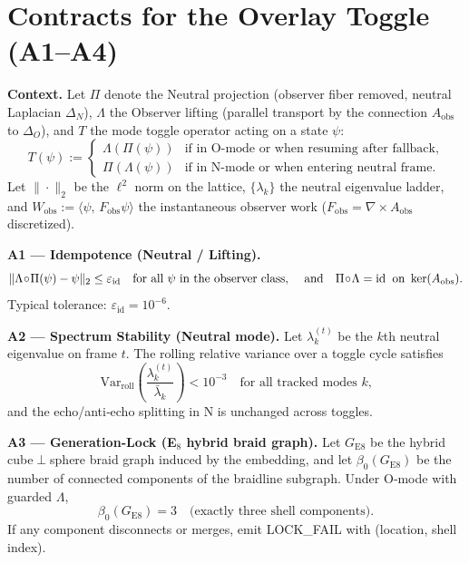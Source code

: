 \section*{Contracts for the Overlay Toggle (A1–A4)}

\noindent\textbf{Context.}
Let $\Pi$ denote the Neutral projection (observer fiber removed, neutral Laplacian $\Delta_N$),
$\Lambda$ the Observer lifting (parallel transport by the connection $A_{\mathrm{obs}}$ to $\Delta_O$),
and $T$ the mode toggle operator acting on a state $\psi$:
\[
T(\psi) :=
\begin{cases}
\Lambda(\Pi(\psi)) & \text{if in O-mode or when resuming after fallback},\\
\Pi(\Lambda(\psi)) & \text{if in N-mode or when entering neutral frame}.
\end{cases}
\]
Let $\|\cdot\|_2$ be the $\ell^2$ norm on the lattice, $\{\lambda_k\}$ the neutral eigenvalue ladder, and
$W_{\mathrm{obs}} := \langle \psi,\, F_{\mathrm{obs}} \psi\rangle$ the instantaneous observer work
($F_{\mathrm{obs}} = \nabla\times A_{\mathrm{obs}}$ discretized).

\vspace{0.75em}
\noindent\textbf{A1 — Idempotence (Neutral / Lifting).}
\[
\|\Lambda\!\circ\!\Pi(\psi) - \psi\|_2 \le \varepsilon_{\mathrm{id}} \quad
\text{for all $\psi$ in the observer class, \quad and}\quad
\Pi\!\circ\!\Lambda = \mathrm{id}\;\; \text{on } \ker(A_{\mathrm{obs}}).
\]
Typical tolerance: $\varepsilon_{\mathrm{id}} = 10^{-6}$.

\vspace{0.5em}
\noindent\textbf{A2 — Spectrum Stability (Neutral mode).}
Let $\lambda_k^{(t)}$ be the $k$th neutral eigenvalue on frame $t$.
The rolling relative variance over a toggle cycle satisfies
\[
\mathrm{Var}_\mathrm{roll}\!\left(\frac{\lambda_k^{(t)}}{\bar{\lambda}_k}\right) < 10^{-3} 
\quad\text{for all tracked modes $k$,}
\]
and the echo/anti‑echo splitting in N is unchanged across toggles.

\vspace{0.5em}
\noindent\textbf{A3 — Generation‑Lock (E$_8$ hybrid braid graph).}
Let $G_\mathrm{E8}$ be the hybrid cube$\perp$sphere braid graph induced by the embedding,
and let $\beta_0(G_\mathrm{E8})$ be the number of connected components of the braidline subgraph.
Under O‑mode with guarded $\Lambda$,
\[
\beta_0(G_\mathrm{E8}) = 3 \quad\text{(exactly three shell components).}
\]
If any component disconnects or merges, emit \textsc{LOCK\_FAIL} with (location, shell index).

